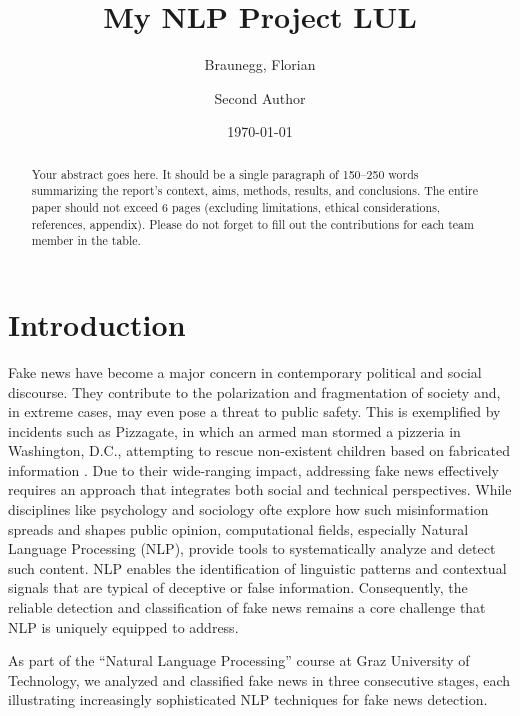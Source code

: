 \documentclass[12pt,a4paper,twocolumn]{article}
\title{My NLP Project LUL} %
\author[1]{Braunegg, Florian} %
\author[2]{Second Author}
\affil[1]{Graz University of Technology, Graz, Austria}
\affil[2]{University of Graz, Graz, Austria}
\date{\today}
\begin{document}
\maketitle


\begin{abstract}
    Your abstract goes here. It should be a single paragraph of 150--250 words summarizing the report’s context, aims, methods, results, and conclusions.
    The entire paper should not exceed 6 pages (excluding limitations, ethical considerations, references, appendix).
    Please do not forget to fill out the contributions for each team member in the table.
\end{abstract}

\section{Introduction}
\label{sec:intro}
Fake news have become a major concern in contemporary political and social discourse. They contribute to the polarization and fragmentation of society \citep{au2022role} and, in extreme cases, may even pose a threat to public safety. This is exemplified by incidents such as Pizzagate, in which an armed man stormed a pizzeria in Washington, D.C., attempting to rescue non-existent children based on fabricated information \citep{2016pizzagate}. Due to their wide-ranging impact, addressing fake news effectively requires an approach that integrates both social and technical perspectives. While disciplines like psychology and sociology ofte explore how such misinformation spreads and shapes public opinion, computational fields, especially Natural Language Processing (NLP), provide tools to systematically analyze and detect such content. NLP enables the identification of linguistic patterns and contextual signals that are typical of deceptive or false information. Consequently, the reliable detection and classification of fake news remains a core challenge that NLP is uniquely equipped to address.

As part of the “Natural Language Processing” course at Graz University of Technology, we analyzed and classified fake news in three consecutive stages, each illustrating increasingly sophisticated NLP techniques for fake news detection.
\end{document}
